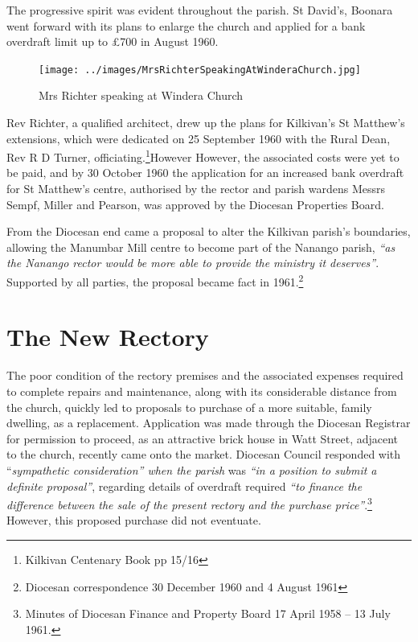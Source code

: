 The progressive spirit was evident throughout the parish. St David's, Boonara went forward with its plans to enlarge the church and applied for a bank overdraft limit up to \pounds700 in August 1960.









\begin{figure}[!htb]
\begin{center}
\texttt{[image: ../images/MrsRichterSpeakingAtWinderaChurch.jpg]}
\caption{Mrs Richter speaking at Windera Church}
\end{center}
\end{figure}




Rev Richter, a qualified architect, drew up the plans for Kilkivan's St Matthew's extensions, which were dedicated on 25 September 1960 with the Rural Dean, Rev R D Turner, officiating.\footnote{Kilkivan Centenary Book pp 15/16}However However, the associated costs were yet to be paid, and by 30 October 1960 the application for an increased bank overdraft for St Matthew's centre, authorised by the rector and parish wardens Messrs Sempf, Miller and Pearson, was approved by the Diocesan Properties Board.


From the Diocesan end came a proposal to alter the Kilkivan parish's boundaries, allowing the Manumbar Mill centre to become part of the Nanango parish, \emph{``as the Nanango rector would be more able to provide the ministry it deserves''}. Supported by all parties, the proposal became fact in 1961.\footnote{Diocesan correspondence 30 December 1960 and 4 August 1961}


\section{The New Rectory}



The poor condition of the rectory premises and the associated expenses required to complete repairs and maintenance, along with its considerable distance from the church, quickly led to proposals to purchase of a more suitable, family dwelling, as a replacement. Application was made through the Diocesan Registrar for permission to proceed, as an attractive brick house in Watt Street, adjacent to the church, recently came onto the market. Diocesan Council responded with ``\emph{sympathetic consideration'' when the parish} was \emph{``in a position to submit a definite proposal''}, regarding details of overdraft required \emph{``to finance the difference between the sale of the present rectory and the purchase price''}.\footnote{Minutes of Diocesan Finance and Property Board 17 April 1958 -- 13 July 1961.} However, this proposed purchase did not eventuate.








